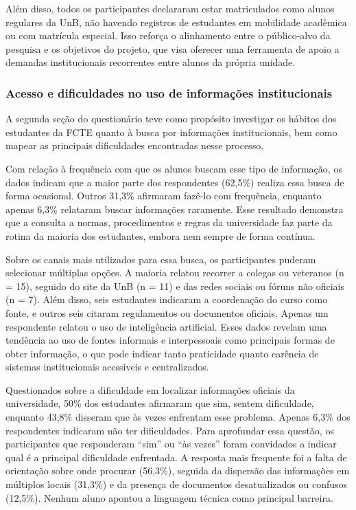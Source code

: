 Além disso, todos os participantes declararam estar matriculados como alunos regulares da UnB, não havendo registros de estudantes em mobilidade acadêmica ou com matrícula especial. Isso reforça o alinhamento entre o público-alvo da pesquisa e os objetivos do projeto, que visa oferecer uma ferramenta de apoio a demandas institucionais recorrentes entre alunos da própria unidade.

\subsubsection{Acesso e dificuldades no uso de informações institucionais}

A segunda seção do questionário teve como propósito investigar os hábitos dos estudantes da FCTE quanto à busca por informações institucionais, bem como mapear as principais dificuldades encontradas nesse processo.

Com relação à frequência com que os alunos buscam esse tipo de informação, os dados indicam que a maior parte dos respondentes (62{,}5\%) realiza essa busca de forma ocasional. Outros 31{,}3\% afirmaram fazê-lo com frequência, enquanto apenas 6{,}3\% relataram buscar informações raramente. Esse resultado demonstra que a consulta a normas, procedimentos e regras da universidade faz parte da rotina da maioria dos estudantes, embora nem sempre de forma contínua.

Sobre os canais mais utilizados para essa busca, os participantes puderam selecionar múltiplas opções. A maioria relatou recorrer a colegas ou veteranos (n = 15), seguido do site da UnB (n = 11) e das redes sociais ou fóruns não oficiais (n = 7). Além disso, seis estudantes indicaram a coordenação do curso como fonte, e outros seis citaram regulamentos ou documentos oficiais. Apenas um respondente relatou o uso de inteligência artificial. Esses dados revelam uma tendência ao uso de fontes informais e interpessoais como principais formas de obter informação, o que pode indicar tanto praticidade quanto carência de sistemas institucionais acessíveis e centralizados.

Questionados sobre a dificuldade em localizar informações oficiais da universidade, 50\% dos estudantes afirmaram que sim, sentem dificuldade, enquanto 43{,}8\% disseram que às vezes enfrentam esse problema. Apenas 6{,}3\% dos respondentes indicaram não ter dificuldades. Para aprofundar essa questão, os participantes que responderam “sim” ou “às vezes” foram convidados a indicar qual é a principal dificuldade enfrentada. A resposta mais frequente foi a falta de orientação sobre onde procurar (56{,}3\%), seguida da dispersão das informações em múltiplos locais (31{,}3\%) e da presença de documentos desatualizados ou confusos (12{,}5\%). Nenhum aluno apontou a linguagem técnica como principal barreira.

